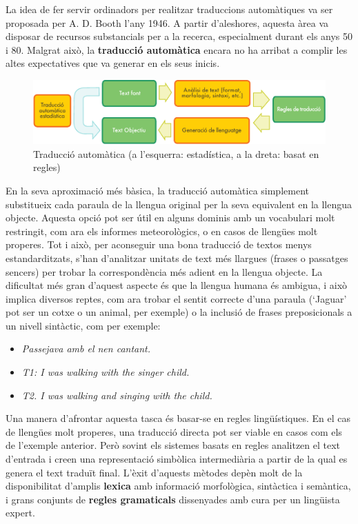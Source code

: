 \begin{multicols}{2}
La idea de fer servir ordinadors per realitzar traduccions automàtiques va ser proposada per A. D. Booth l’any 1946. A partir d’aleshores, aquesta àrea va disposar de recursos substancials per a la recerca, especialment durant els anys 50 i 80. Malgrat això, la \textbf{traducció automàtica} encara no ha arribat a complir les altes expectatives que va generar en els seus inicis.  

\begin{figure}[htb]
  \vspace{-21mm}
  \center
  \includegraphics[width=\textwidth]{../_media/catalan/machine_translation}
  \vspace{-2mm}
  \caption{Traducció automàtica (a l'esquerra: estadística, a la dreta: basat en regles)}
  \label{fig:mtarch_ca}
\end{figure}

En la seva aproximació més bàsica, la traducció automàtica simplement substitueix cada paraula de la llengua original per la seva equivalent en la llengua objecte. Aquesta opció pot ser útil en alguns dominis amb un vocabulari molt restringit, com ara els informes meteorològics, o en casos de llengües molt properes. Tot i això, per aconseguir una bona traducció de textos menys estandarditzats, s’han d’analitzar unitats de text més llargues (frases o passatges sencers) per trobar la correspondència més adient en la llengua objecte. La dificultat més gran d’aquest aspecte és que la llengua humana és ambigua, i això implica diversos reptes, com ara trobar el sentit correcte d’una paraula (‘Jaguar’ pot ser un cotxe o un animal, per exemple) o la inclusió de frases preposicionals a un nivell sintàctic, com per exemple:
\begin{itemize}
\item \textit{Passejava amb el nen cantant.}
\item \textit{T1: I was walking with the singer child.}
\item \textit{T2. I was walking and singing with the child.}
\end{itemize}

Una manera d’afrontar aquesta tasca és basar-se en regles lingüístiques. En el cas de llengües molt properes, una traducció directa pot ser viable en casos com els de l’exemple anterior. Però sovint els sistemes basats en regles analitzen el text d’entrada i creen una representació simbòlica intermediària a partir de la qual es genera el text traduït final. L’èxit d’aquests mètodes depèn molt de la disponibilitat d’amplis \textbf{lexica} amb informació morfològica, sintàctica i semàntica, i grans conjunts de \textbf{regles gramaticals} dissenyades amb cura per un lingüista expert.


\end{multicols}
